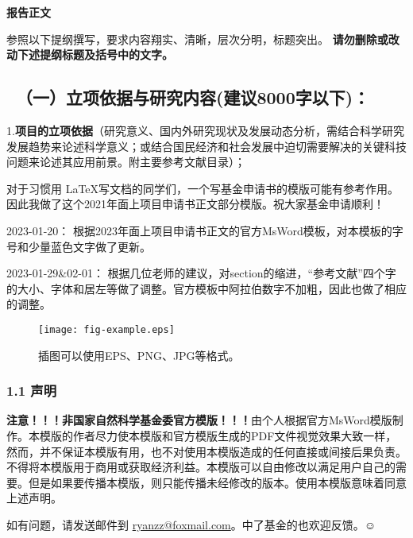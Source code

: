 \documentclass[12pt,UTF8,AutoFakeBold,a4paper]{ctexart} %
\newcommand{\sanhao}{\fontsize{16pt}{\baselineskip}\selectfont}
\newcommand{\sihao}{\fontsize{14pt}{\baselineskip}\selectfont}
\begin{document}
\begin{center}
{\sanhao \kaishu \bfseries 报告正文}
\end{center}

{\sihao \kaishu 参照以下提纲撰写，要求内容翔实、清晰，层次分明，标题突出。{\color{MsBlue} \bfseries 请勿删除或改动下述提纲标题及括号中的文字。}}
\vskip -5mm
{\color{MsBlue} \subsection{\sihao \kaishu \quad \ （一）立项依据与研究内容(建议8000字以下)： }}

{\sihao \kaishu \color{MsBlue} 1.{\bfseries 项目的立项依据}（研究意义、国内外研究现状及发展动态分析，需结合科学研究发展趋势来论述科学意义；或结合国民经济和社会发展中迫切需要解决的关键科技问题来论述其应用前景。附主要参考文献目录）；}

对于习惯用 \LaTeX 写文档的同学们，一个写基金申请书的模版可能有参考作用。因此我做了这个2021年面上项目申请书正文部分模版。祝大家基金申请顺利！

2023-01-20： 根据2023年面上项目申请书正文的官方MsWord模板，对本模板的字号和少量蓝色文字做了更新。

2023-01-29\&02-01： 根据几位老师的建议，对section的缩进，“参考文献”四个字的大小、字体和居左等做了调整。官方模板中阿拉伯数字不加粗，因此也做了相应的调整。

\begin{figure}[!th]
\begin{center}
\texttt{[image: fig-example.eps]}
\caption{插图可以使用EPS、PNG、JPG等格式。}
\label{fig:example}
\end{center}
\end{figure}



\vskip 2mm
\subsubsection{1.1 声明}
{\bfseries \color{red} 注意！！！非国家自然科学基金委官方模版！！！}由个人根据官方MsWord模版制作。本模版的作者尽力使本模版和官方模版生成的PDF文件视觉效果大致一样，然而，并不保证本模版有用，也不对使用本模版造成的任何直接或间接后果负责。 不得将本模版用于商用或获取经济利益。本模版可以自由修改以满足用户自己的需要。但是如果要传播本模版，则只能传播未经修改的版本。使用本模版意味着同意上述声明。

如有问题，请发送邮件到 \href{mailto:ryanzz@foxmail.com}{ryanzz@foxmail.com}。中了基金的也欢迎反馈。$\smiley$
\end{document}
